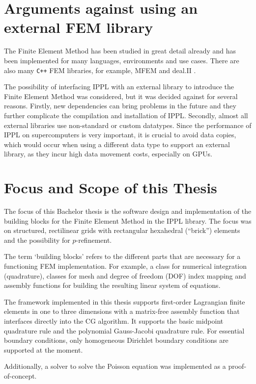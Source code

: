 \section{Arguments against using an external FEM library}

The Finite Element Method has been studied in great detail already and has been implemented for many languages, environments and use cases.
There are also many \texttt{C++} FEM libraries, for example, MFEM \cite{anderson_mfem_2021} and deal.II \cite{bangerth_dealiigeneral-purpose_2007}.

The possibility of interfacing IPPL with an external library to introduce the Finite Element Method was considered,
but it was decided against for several reasons.
Firstly, new dependencies can bring problems in the future and they further complicate the compilation and installation of IPPL.
Secondly, almost all external libraries use non-standard or custom datatypes.
Since the performance of IPPL on supercomputers is very important, it is crucial to avoid data copies,
which would occur when using a different data type to support an external library,
as they incur high data movement costs, especially on GPUs.

\section{Focus and Scope of this Thesis}

The focus of this Bachelor thesis is the software design and implementation
of the building blocks for the Finite Element Method in the IPPL \cite{frey_ippl-frameworkippl_2023} library.
The focus was on structured, rectilinear grids with rectangular hexahedral (``brick'') elements and the possibility for $p$-refinement.

The term `building blocks' refers to the different parts that are necessary for a functioning FEM implementation.
For example, a class for numerical integration (quadrature),
classes for mesh and degree of freedom (DOF) index mapping and assembly functions for building the resulting linear system of equations.

The framework implemented in this thesis supports first-order Lagrangian finite elements in
one to three dimensions with a matrix-free assembly function that interfaces directly into the CG algorithm.
It supports the basic midpoint quadrature rule and the polynomial Gauss-Jacobi quadrature rule.
For essential boundary conditions, only homogeneous Dirichlet boundary conditions are supported at the moment.

Additionally, a solver to solve the Poisson equation was implemented as a proof-of-concept.

